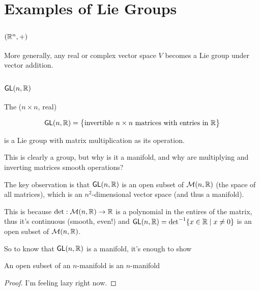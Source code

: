 \documentclass[../main.tex]{subfiles}
\begin{document}
\section{Examples of Lie Groups}

  
\subsection{$(\mathbb{R}^n, +)$}

More generally, any real or complex vector space $V$ becomes a Lie group 
under vector addition.

\subsection{$\mathsf{GL}(n,\mathbb{R})$}

\begin{defn}
  The ($n \times n$, real)  

  \[ \mathsf{GL}(n,\mathbb{R}) = \big \{ \text{invertible $n \times n$ matrices with entries in $\mathbb{R}$} \big \} \]

  is a Lie group with matrix multiplication as its operation.
\end{defn}

This is clearly a group, but why is it a manifold, and why are multiplying
and inverting matrices smooth operations?

The key observation is that $\mathsf{GL}(n,\mathbb{R})$ is an open subset of 
$\mathcal{M}(n,\mathbb{R})$ (the space of all matrices), which is an $n^2$-dimensional
vector space (and thus a manifold).

This is because $\text{det} : \mathcal{M}(n,\mathbb{R}) \to \mathbb{R}$ is a polynomial in
the entires of the matrix, thus it's continuous (smooth, even!) and 
$\mathsf{GL}(n,\mathbb{R}) = \text{det}^{-1} \{ x \in \mathbb{R} \mid x \neq 0 \}$ is an 
open subset of $\mathcal{M}(n,\mathbb{R})$.

So to know that $\mathsf{GL}(n,\mathbb{R})$ is a manifold, it's enough to show

\begin{thm}
  An open subset of an $n$-manifold is an $n$-manifold
\end{thm}

\begin{proof}
  I'm feeling lazy right now.

\end{proof}
\end{document}
